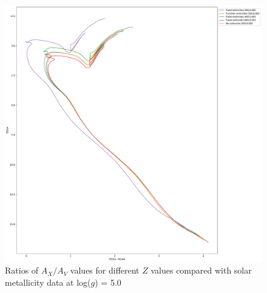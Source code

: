 \documentclass[12pt, a4paper]{report}
\begin{document}
\begin{figure}[h]
\begin{center}
\includegraphics[scale=0.3]{../basti_isochrones_10_13Gyr/Extinction_T5k_FeH0fix_func_f555w_f555wmf814w_500_400_600_Myr_FeH_0p002_ref_noext_Av_1p0.pdf}
\caption{Ratios of $A_{X}/A_{V}$ values for different $Z$ values compared with solar metallicity data at log($g$) = 5.0}
\label{wfc3_isoc1_T5k}
\end{center}
\end{figure}
\end{document}

